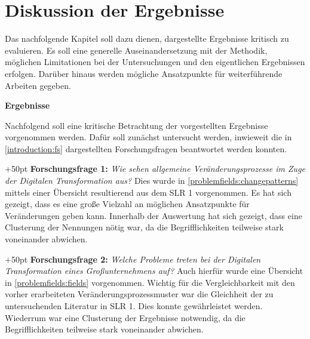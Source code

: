 \chapter{Diskussion der Ergebnisse}
\label{evaluation}


Das nachfolgende Kapitel soll dazu dienen, dargestellte Ergebnisse kritisch zu evaluieren. Es soll eine generelle Auseinandersetzung mit der Methodik, möglichen Limitationen bei der Untersuchungen und den eigentlichen Ergebnissen erfolgen. Darüber hinaus werden mögliche Ansatzpunkte für weiterführende Arbeiten gegeben.

\textbf{Ergebnisse}

Nachfolgend soll eine kritische Betrachtung der vorgestellten Ergebnisse vorgenommen werden. Dafür soll zunächst untersucht werden, inwieweit die in \ref{introduction:fs} dargestellten Forschungsfragen beantwortet werden konnten. 

\hangindent+50pt 
\textbf{Forschungsfrage 1:}\textit{ Wie sehen allgemeine Veränderungsprozesse im Zuge der Digitalen Transformation aus?} Dies wurde in  \ref{problemfields:changepatterns} mittels einer Übersicht resultierend aus dem SLR 1 vorgenommen. Es hat sich gezeigt, dass es eine große Vielzahl an möglichen Ansatzpunkte für Veränderungen geben kann. Innerhalb der Auswertung hat sich gezeigt, dass eine Clusterung der Nennungen nötig war, da die Begrifflichkeiten teilweise stark voneinander abwichen.  

\hangindent+50pt 
\textbf{Forschungsfrage 2:} \textit{Welche Probleme treten bei der Digitalen Transformation eines Großunternehmens auf?} Auch hierfür wurde eine Übersicht in \ref{problemfields:fields} vorgenommen. Wichtig für die Vergleichbarkeit mit den vorher erarbeiteten Veränderungsprozessmuster war die Gleichheit der zu untersuchenden Literatur in SLR 1. Dies konnte gewährleistet werden. Wiederrum war eine Clusterung der Ergebnisse notwendig, da die Begrifflichkeiten teilweise stark voneinander abwichen.


